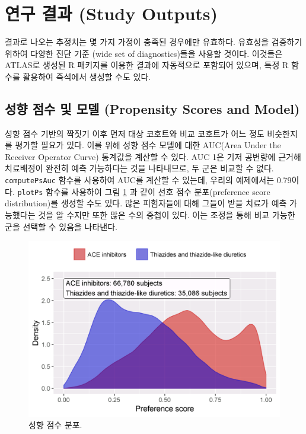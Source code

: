 \documentclass[11pt]{book}
\theoremstyle{definition}
\theoremstyle{definition}
\theoremstyle{definition}
\theoremstyle{remark}
\begin{document}
\section{연구 결과 (Study Outputs)}\label{studyOutputs}

결과로 나오는 추정치는 몇 가지 가정이 충족된 경우에만 유효하다. 유효성을
검증하기 위하여 다양한 진단 기준 (wide set of diagnostics)들을 사용할
것이다. 이것들은 ATLAS로 생성된 R 패키지를 이용한 결과에 자동적으로
포함되어 있으며, 특정 R 함수를 활용하여 즉석에서 생성할 수도 있다.

\subsection{성향 점수 및 모델 (Propensity Scores and
Model)}\label{----propensity-scores-and-model}

성향 점수 기반의 짝짓기 이후 먼저 대상 코호트와 비교 코호트가 어느 정도
비슷한지를 평가할 필요가 있다. 이를 위해 성향 점수 모델에 대한 AUC(Area
Under the Receiver Operator Curve) 통계값을 계산할 수 있다. AUC 1은 기저
공변량에 근거해 치료배정이 완전히 예측 가능하다는 것을 나타내므로, 두
군은 비교할 수 없다. \texttt{computePsAuc} 함수를 사용하여 AUC를 계산할
수 있는데, 우리의 예제에서는 0.79이다. \texttt{plotPs} 함수를 사용하여
그림 \ref{fig:ps} 과 같이 선호 점수 분포(preference score
distribution)를 생성할 수도 있다. 많은 피험자들에 대해 그들이 받을
치료가 예측 가능했다는 것을 알 수지만 또한 많은 수의 중첩이 있다. 이는
조정을 통해 비교 가능한 군을 선택할 수 있음을 나타낸다.

\begin{figure}

{\centering \includegraphics[width=0.8\linewidth]{images/PopulationLevelEstimation/ps} 

}

\caption{성향 점수 분포.}\label{fig:ps}
\end{figure}
\end{document}

